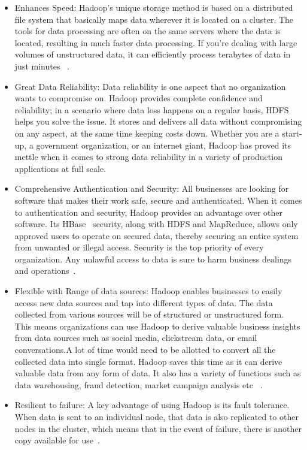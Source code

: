 \begin{itemize}
\item Enhances Speed: 
Hadoop's unique storage method is based on a distributed file system that 
basically maps data wherever it is located on a cluster. The tools for data 
processing are often on the same servers where the data is located, resulting 
in much faster data processing. If you’re dealing with large volumes of 
unstructured data, it can efficiently process terabytes of data in just minutes
~\cite{hid-sp18-406-hadoop-intro10}.

\item Great Data Reliability: 
Data reliability is one aspect that no organization wants to compromise on. 
Hadoop provides complete confidence and reliability; in a scenario where data 
loss happens on a regular basis, HDFS helps you solve the issue. It stores and 
delivers all data without compromising on any aspect, at the same time keeping 
costs down. Whether you are a start-up, a government organization, or an 
internet giant, Hadoop has proved its mettle when it comes to strong data 
reliability in a variety of production applications at full scale.

\item Comprehensive Authentication and Security: 
All businesses are looking for software that makes their work safe, secure and 
authenticated. When it comes to authentication and security, Hadoop provides an 
advantage over other software. Its HBase~\cite{hid-sp18-406-hbase} security, 
along with HDFS and MapReduce, allows only approved users to operate on secured 
data, thereby securing an entire system from unwanted or illegal access. 
Security is the top priority of every organization. Any unlawful access to data 
is sure to harm business dealings and operations~\cite{hid-sp18-406-hadoop-intro11}.

\item Flexible with Range of data sources: 
Hadoop enables businesses to easily access new data sources and tap into 
different types of data. The data collected from various sources will be of 
structured or unstructured form. This means organizations can use Hadoop to 
derive valuable business insights from data sources such as social media, 
clickstream data,  or email conversations.A lot of time would need to be 
allotted to convert all the collected data into single format. Hadoop saves 
this time as it can derive valuable data from any form of data. It also has a 
variety of functions such as data warehousing, fraud detection, market campaign 
analysis etc ~\cite{hid-sp18-406-hadoop-intro12}.

\item Resilient to failure: 
A key advantage of using Hadoop is its fault tolerance. When data is sent to an 
individual node, that data is also replicated to other nodes in the cluster, 
which means that in the event of failure, there is another copy available for 
use~\cite{hid-sp18-406-hadoop-intro13}.

\end{itemize}

